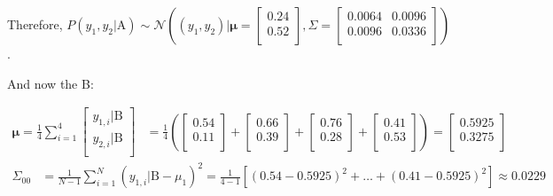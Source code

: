 \documentclass[12pt]{article}
\begin{document}
\begin{enumerate}[leftmargin=\labelsep]
\begin{enumerate}
                Therefore, $P(y_1, y_2|\text{A}) \sim \mathcal{N}\left((y_1, y_2) | \boldsymbol{\mu} = \begin{bmatrix}0.24 \\0.52 \\\end{bmatrix},
                  \Sigma = \begin{bmatrix}0.0064 & 0.0096 \\0.0096 & 0.0336 \\\end{bmatrix}\right)$.

                And now the B:

                $$
                  \begin{aligned}
                    \boldsymbol{\mu} = \frac{1}{4} \sum^{4}_{i=1} \begin{bmatrix}y_{1,i} | \text{B} \\y_{2,i} | \text{B} \\\end{bmatrix} & =
                    \frac{1}{4}
                    \left(\begin{bmatrix}0.54 \\0.11 \\\end{bmatrix} +
                    \begin{bmatrix}0.66 \\0.39 \\\end{bmatrix} +
                    \begin{bmatrix}0.76 \\0.28 \\\end{bmatrix} +
                    \begin{bmatrix}0.41 \\0.53 \\\end{bmatrix}\right)
                    = \begin{bmatrix}0.5925 \\0.3275 \\\end{bmatrix}
                  \end{aligned}
                $$
                $$
                  \begin{aligned}
                    \Sigma_{00} & = \frac{1}{N-1} \sum^{N}_{i=1} (y_{1,i} | \text{B} - \mu_{1})^2 = \frac{1}{4-1} \left[(0.54-0.5925)^2 + \dots + (0.41-0.5925)^2\right] \approx 0.0229 \\

\end{aligned}$$
\end{enumerate}
\end{enumerate}
\end{document}
